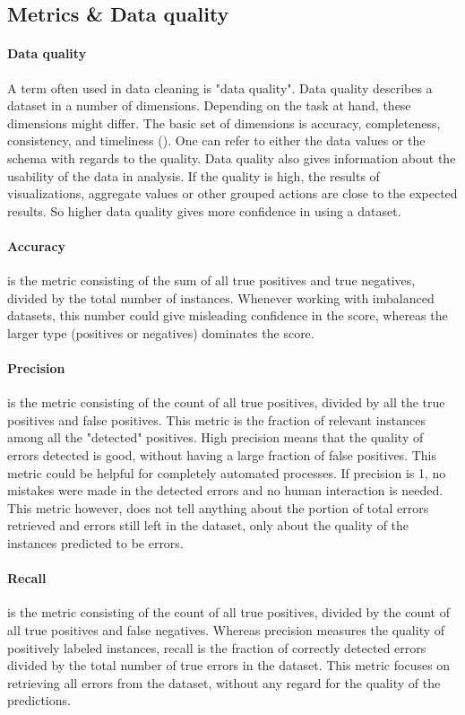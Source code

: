 \subsection{Metrics \& Data quality}
\paragraph{Data quality} A term often used in data cleaning is "data quality". Data quality describes a dataset in a number of dimensions. Depending on the task at hand, these dimensions might differ. The basic set of dimensions is accuracy, completeness, consistency, and timeliness (\cite{Batini2009-aa}). One can refer to either the data values or the schema with regards to the quality. Data quality also gives information about the usability of the data in analysis. If the quality is high, the results of visualizations, aggregate values or other grouped actions are close to the expected results. So higher data quality gives more confidence in using a dataset.

\paragraph{Accuracy}
is the metric consisting of the sum of all true positives and true negatives, divided by the total number of instances. Whenever working with imbalanced datasets, this number could give misleading confidence in the score, whereas the larger type (positives or negatives) dominates the score.

\paragraph{Precision}
is the metric consisting of the count of all true positives, divided by all the true positives and false positives. This metric is the fraction of relevant instances among all the "detected" positives. High precision means that the quality of errors detected is good, without having a large fraction of false positives. This metric could be helpful for completely automated processes. If precision is 1, no mistakes were made in the detected errors and no human interaction is needed. This metric however, does not tell anything about the portion of total errors retrieved and errors still left in the dataset, only about the quality of the instances predicted to be errors.

\paragraph{Recall} 
is the metric consisting of the count of all true positives, divided by the count of all true positives and false negatives. Whereas precision measures the quality of positively labeled instances, recall is the fraction of correctly detected errors divided by the total number of true errors in the dataset. This metric focuses on retrieving all errors from the dataset, without any regard for the quality of the predictions.

